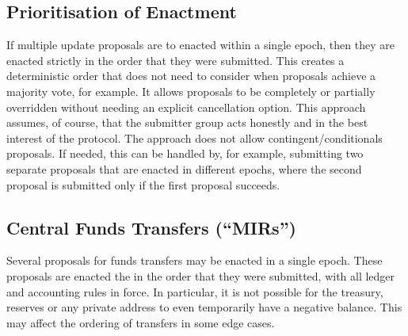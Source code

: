 \subsection{Prioritisation of Enactment}

If multiple update proposals are to enacted within a single epoch, then they are enacted strictly in the order that they were submitted.
This creates a deterministic order that does not need to consider when proposals achieve a majority vote, for example.
It allows proposals to be completely or partially overridden without needing an explicit cancellation option.
This approach assumes, of course, that the submitter group acts honestly and in the best interest of the protocol.
The approach does not allow contingent/conditionals proposals.  If needed, this can be handled by, for example, submitting two separate proposals that are enacted
in different epochs, where the second proposal is submitted only if the first proposal succeeds.

\subsection{Central Funds Transfers (``MIRs'')}

Several proposals for funds transfers may be enacted in a single epoch.  These proposals are enacted the in the order that they were submitted, with all ledger and
accounting rules in force.  In particular, it is not possible for the treasury, reserves or any private address to even temporarily have a negative balance.  This may affect
the ordering of transfers in some edge cases.
